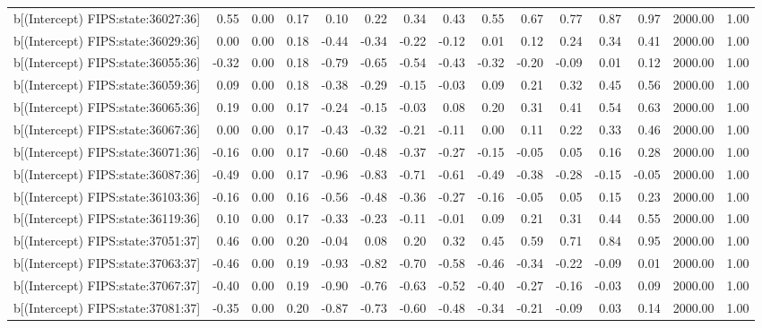 \begin{table}[ht]
\begin{tabular}{rrrrrrrrrrrrrrr}
  b[(Intercept) FIPS:state:36027:36] & 0.55 & 0.00 & 0.17 & 0.10 & 0.22 & 0.34 & 0.43 & 0.55 & 0.67 & 0.77 & 0.87 & 0.97 & 2000.00 & 1.00 \\ 
  b[(Intercept) FIPS:state:36029:36] & 0.00 & 0.00 & 0.18 & -0.44 & -0.34 & -0.22 & -0.12 & 0.01 & 0.12 & 0.24 & 0.34 & 0.41 & 2000.00 & 1.00 \\ 
  b[(Intercept) FIPS:state:36055:36] & -0.32 & 0.00 & 0.18 & -0.79 & -0.65 & -0.54 & -0.43 & -0.32 & -0.20 & -0.09 & 0.01 & 0.12 & 2000.00 & 1.00 \\ 
  b[(Intercept) FIPS:state:36059:36] & 0.09 & 0.00 & 0.18 & -0.38 & -0.29 & -0.15 & -0.03 & 0.09 & 0.21 & 0.32 & 0.45 & 0.56 & 2000.00 & 1.00 \\ 
  b[(Intercept) FIPS:state:36065:36] & 0.19 & 0.00 & 0.17 & -0.24 & -0.15 & -0.03 & 0.08 & 0.20 & 0.31 & 0.41 & 0.54 & 0.63 & 2000.00 & 1.00 \\ 
  b[(Intercept) FIPS:state:36067:36] & 0.00 & 0.00 & 0.17 & -0.43 & -0.32 & -0.21 & -0.11 & 0.00 & 0.11 & 0.22 & 0.33 & 0.46 & 2000.00 & 1.00 \\ 
  b[(Intercept) FIPS:state:36071:36] & -0.16 & 0.00 & 0.17 & -0.60 & -0.48 & -0.37 & -0.27 & -0.15 & -0.05 & 0.05 & 0.16 & 0.28 & 2000.00 & 1.00 \\ 
  b[(Intercept) FIPS:state:36087:36] & -0.49 & 0.00 & 0.17 & -0.96 & -0.83 & -0.71 & -0.61 & -0.49 & -0.38 & -0.28 & -0.15 & -0.05 & 2000.00 & 1.00 \\ 
  b[(Intercept) FIPS:state:36103:36] & -0.16 & 0.00 & 0.16 & -0.56 & -0.48 & -0.36 & -0.27 & -0.16 & -0.05 & 0.05 & 0.15 & 0.23 & 2000.00 & 1.00 \\ 
  b[(Intercept) FIPS:state:36119:36] & 0.10 & 0.00 & 0.17 & -0.33 & -0.23 & -0.11 & -0.01 & 0.09 & 0.21 & 0.31 & 0.44 & 0.55 & 2000.00 & 1.00 \\ 
  b[(Intercept) FIPS:state:37051:37] & 0.46 & 0.00 & 0.20 & -0.04 & 0.08 & 0.20 & 0.32 & 0.45 & 0.59 & 0.71 & 0.84 & 0.95 & 2000.00 & 1.00 \\ 
  b[(Intercept) FIPS:state:37063:37] & -0.46 & 0.00 & 0.19 & -0.93 & -0.82 & -0.70 & -0.58 & -0.46 & -0.34 & -0.22 & -0.09 & 0.01 & 2000.00 & 1.00 \\ 
  b[(Intercept) FIPS:state:37067:37] & -0.40 & 0.00 & 0.19 & -0.90 & -0.76 & -0.63 & -0.52 & -0.40 & -0.27 & -0.16 & -0.03 & 0.09 & 2000.00 & 1.00 \\ 
  b[(Intercept) FIPS:state:37081:37] & -0.35 & 0.00 & 0.20 & -0.87 & -0.73 & -0.60 & -0.48 & -0.34 & -0.21 & -0.09 & 0.03 & 0.14 & 2000.00 & 1.00 \\ 

\end{tabular}
\end{table}
